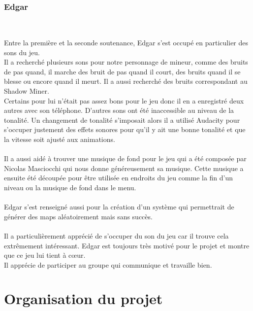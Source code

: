 \documentclass[titlepage, 13px, a4paper]{report}
\begin{document}
\newpage





\section{Edgar}
\paragraph{} \hspace{0pt} \\
Entre la première et la seconde soutenance, Edgar s’est occupé en particulier des sons du jeu. \\ 
Il a recherché plusieurs sons pour notre personnage de mineur, comme des bruits de pas quand, il marche des bruit de pas quand il court, 
des bruits quand il se blesse ou encore quand il meurt. Il a aussi recherché des bruits correspondant au Shadow Miner. \\
Certains pour lui n’était pas assez bons pour le jeu donc il en a enregistré deux autres avec son téléphone. 
D’autres sons ont été inaccessible au niveau de la tonalité. Un changement de tonalité s'imposait alors il a utilisé Audacity pour 
s’occuper justement des effets sonores pour qu’il y ait une bonne tonalité et que la vitesse soit ajusté aux animations. \\ \\

Il a aussi aidé à trouver une musique de fond pour le jeu qui a été composée par Nicolas Masciocchi 
qui nous donne généreusement sa musique. Cette musique a ensuite été découpée pour être utilisée en endroits du jeu
comme la fin d’un niveau ou la musique de fond dans le menu. \\ \\

Edgar s’est renseigné aussi pour la création d’un système qui permettrait de générer des maps aléatoirement mais sans succès. \\ \\

Il a particulièrement apprécié de s'occuper du son du jeu car il trouve cela extrêmement intéressant.
Edgar est toujours très motivé pour le projet et montre que ce jeu lui tient à cœur. \\
Il apprécie de participer au groupe qui communique et travaille bien.


\newpage
{}
\part{Organisation du projet}
\end{document}
